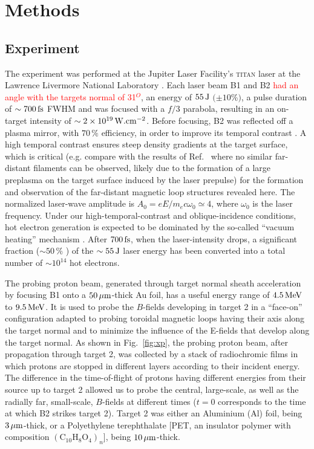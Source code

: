 \documentclass[aps,twocolumn,showpacs,superscriptaddress]{revtex4}
\begin{document}
\section*{Methods}
\subsection*{Experiment}
The experiment %
was performed at the Jupiter Laser Facility's \textsc{titan} laser at the Lawrence Livermore National Laboratory \cite{RSI_Albertazzi_2015}. Each laser beam B1 and B2 \textcolor{red}{had an angle with the targets normal of 31$^O$}, an energy of $55\,\rm J$ $(\pm 10$\%$)$, a pulse duration of $\sim 700\,\rm fs$ FWHM and was focused with a $f/3$ parabola, resulting in an on-target intensity of $\sim 2\times 10^{19}\,\rm W.cm^{-2}$. Before focusing, B2 was reflected off a plasma mirror, with $70\,\%$ efficiency, in order to improve its temporal contrast \cite{PRE_Doumy_2004}. 
A high temporal contrast ensures steep density gradients at the target surface, which is critical (e.g. compare with the results of Ref.~\cite{PRL_Sarri_2012} where no similar far-distant filaments can be observed, likely due to the formation of a large preplasma on the target surface induced by the laser prepulse) for the formation and observation of the far-distant magnetic loop structures revealed here. The normalized laser-wave amplitude is $A_0 = eE/m_ec\omega_0 \simeq 4$, where $\omega_0$ is the laser frequency. Under our high-temporal-contrast and oblique-incidence conditions, hot electron generation is expected to be dominated by the so-called ``vacuum heating'' mechanism \cite{PRL_Brunel_1987}. After $700\,\rm fs$, when the laser-intensity drops, a significant fraction ($\sim 50\,\%$ \cite{PRL_Ping_2008}) of the $\sim 55\, \rm J$ laser energy has been converted into a total number of $\sim 10^{14}$ hot electrons.

The probing proton beam, generated through target normal sheath acceleration \cite{RMP_Macchi_2013} by focusing B1 onto a $50\,\rm \mu m$-thick Au foil, has a useful energy range of $4.5\,\rm MeV$ to $9.5\,\rm MeV$. It is used to probe the $B$-fields developing in target 2 in a ``face-on'' configuration \cite{RSI_Albertazzi_2015} adapted to probing toroidal magnetic loops having their axis along the target normal and to minimize the influence of the E-fields that develop along the target normal. As shown in Fig.~\ref{fig:xp}, the probing proton beam, after propagation through target 2, was collected by a stack of radiochromic films in which protons are stopped in different layers according to their incident energy. The difference in the time-of-flight of protons having different energies from their source up to target 2 allowed us to probe the central, large-scale, as well as the radially far, small-scale, $B$-fields at different times ($t=0$ corresponds to the time at which B2 strikes target 2).
Target 2 was either an Aluminium (Al) foil, being $3\,\rm \mu m$-thick, or a Polyethylene terephthalate [PET, an insulator polymer with composition $(\mathrm{C}_{10}\mathrm{H}_8\mathrm{O}_4)_n$], being $10\,\rm \mu m$-thick.
 
\end{document}
